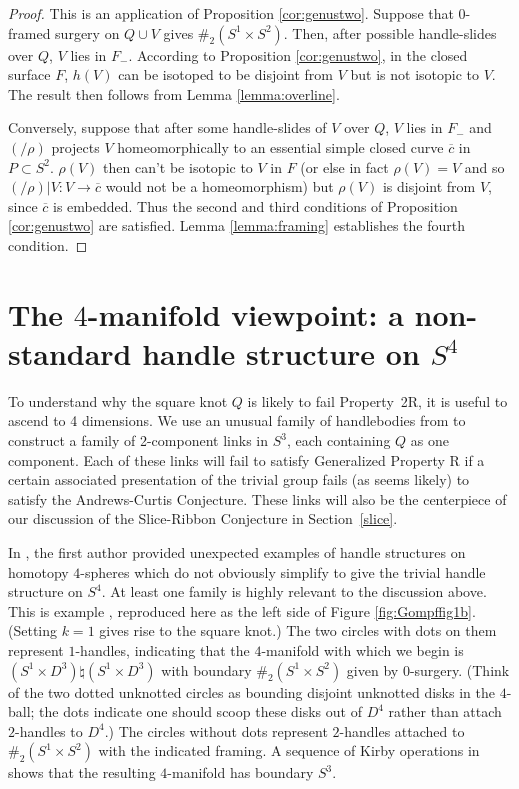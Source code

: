 \documentclass{amsart}
\begin{document}
\begin{proof}  This is an application of Proposition \ref{cor:genustwo}.  Suppose that  $0$-framed surgery on $Q \cup V$ gives $\#_{2} (S^{1} \times S^{2})$.  Then, after possible handle-slides over $Q$, $V$ lies in $F_-$.
According to Proposition \ref{cor:genustwo}, in the closed surface $F$, $h(V)$ can be isotoped to be disjoint from $V$ but is not isotopic to $V$.  The result then follows from Lemma \ref{lemma:overline}.

Conversely, suppose that after some handle-slides of $V$ over $Q$, $V$ lies in $F_-$ and $(/\rho)$ projects $V$ homeomorphically to an essential simple closed curve $\overline{c}$ in $P \subset S^2$.  $\rho(V)$ then can't be isotopic to $V$ in $F$ (or else in fact $\rho(V) = V$ and so $(/\rho)|V: V \to \overline{c}$ would not be a homeomorphism) but $\rho(V)$ is disjoint from $V$, since $\overline{c}$ is embedded.  Thus the second and third  conditions of Proposition \ref{cor:genustwo} are satisfied.  Lemma \ref{lemma:framing} establishes the fourth condition.
\end{proof}


\section{The $4$-manifold viewpoint: a non-standard handle structure on $S^4$}    \label{sect:nonstandard}

To understand why the square knot $Q$ is likely to fail Property~2R, it is useful to ascend to 4 dimensions. We use an unusual family of handlebodies from \cite{Go1} to construct a family of 2-component links in $S^3$, each containing $Q$ as one component. Each of these links will fail to satisfy Generalized Property R if a certain associated presentation of the trivial group fails (as seems likely) to satisfy the Andrews-Curtis Conjecture. These links will also be the centerpiece of our discussion of the Slice-Ribbon Conjecture in Section~\ref{slice}.

In \cite{Go1}, the first author provided unexpected examples of handle structures on homotopy $4$-spheres which do not obviously simplify to give the trivial handle structure on $S^4$.  At least one family is highly relevant to the discussion above.  This is example \cite[Figure 1]{Go1}, reproduced here as the left side of Figure \ref{fig:Gompffig1b}.  (Setting $k = 1$ gives rise to the square knot.)  The two circles with dots on them represent $1$-handles, indicating that the $4$-manifold with which we begin is $(S^1 \times D^3) \natural (S^1 \times D^3)$ with boundary $\#_{2} (S^{1} \times S^{2})$ given by $0$-surgery.  (Think of the two dotted unknotted circles as bounding disjoint unknotted disks in the $4$-ball; the dots indicate one should scoop these disks out of $D^4$ rather than attach $2$-handles to $D^4$.)  The circles without dots represent $2$-handles attached to $\#_{2} (S^{1} \times S^{2})$ with the indicated framing.  A sequence of Kirby operations in \cite[\S 2]{Go1} shows that the resulting $4$-manifold has boundary $S^3$.
\end{document}
